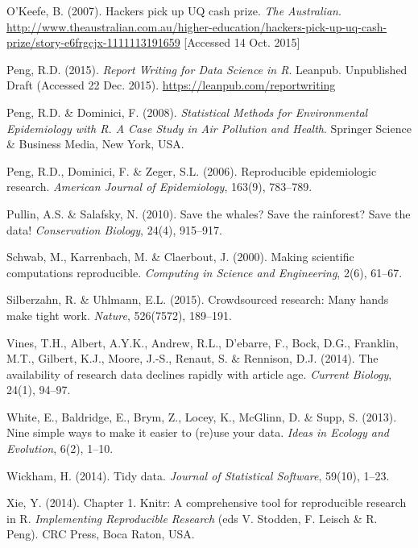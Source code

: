 \documentclass[11pt,a4paper]{article}
\begin{document}
O'Keefe, B. (2007). Hackers pick up UQ cash prize. \emph{The
Australian}.
\url{http://www.theaustralian.com.au/higher-education/hackers-pick-up-uq-cash-prize/story-e6frgcjx-1111113191659}
{[}Accessed 14 Oct. 2015{]}

Peng, R.D. (2015). \emph{Report Writing for Data Science in R}. Leanpub.
Unpublished Draft (Accessed 22 Dec. 2015).
\url{https://leanpub.com/reportwriting}

Peng, R.D. \& Dominici, F. (2008). \emph{Statistical Methods for
Environmental Epidemiology with R. A Case Study in Air Pollution and
Health}. Springer Science \& Business Media, New York, USA.

Peng, R.D., Dominici, F. \& Zeger, S.L. (2006). Reproducible
epidemiologic research. \emph{American Journal of Epidemiology}, 163(9),
783--789.

Pullin, A.S. \& Salafsky, N. (2010). Save the whales? Save the
rainforest? Save the data! \emph{Conservation Biology}, 24(4), 915--917.

Schwab, M., Karrenbach, M. \& Claerbout, J. (2000). Making scientific
computations reproducible. \emph{Computing in Science and Engineering},
2(6), 61--67.

Silberzahn, R. \& Uhlmann, E.L. (2015). Crowdsourced research: Many
hands make tight work. \emph{Nature}, 526(7572), 189--191.

Vines, T.H., Albert, A.Y.K., Andrew, R.L., D{\a'e}barre, F., Bock, D.G.,
Franklin, M.T., Gilbert, K.J., Moore, J.-S., Renaut, S. \& Rennison,
D.J. (2014). The availability of research data declines rapidly with
article age. \emph{Current Biology}, 24(1), 94--97.

White, E., Baldridge, E., Brym, Z., Locey, K., McGlinn, D. \& Supp, S.
(2013). Nine simple ways to make it easier to (re)use your data.
\emph{Ideas in Ecology and Evolution}, 6(2), 1--10.

Wickham, H. (2014). Tidy data. \emph{Journal of Statistical Software},
59(10), 1--23.

Xie, Y. (2014). Chapter 1. Knitr: A comprehensive tool for reproducible
research in R. \emph{Implementing Reproducible Research} (eds V.
Stodden, F. Leisch \& R. Peng). CRC Press, Boca Raton, USA.
\end{document}
